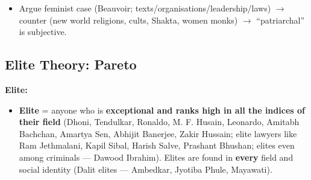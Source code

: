 \begin{QuickRevision}
\begin{itemize}
\item Argue feminist case (Beauvoir; texts/organisations/leadership/laws) $\rightarrow$ counter (new world religions, cults, Shakta, women monks) $\rightarrow$ ``patriarchal'' is subjective.
\end{itemize}
\end{QuickRevision}

\sectiondivider

\subsection{Elite Theory: Pareto}

\begin{KeyConcept}
\textbf{Elite:}
\begin{itemize}
\item \textbf{Elite} = anyone who is \textbf{exceptional and ranks high in all the indices of their field} (Dhoni, Tendulkar, Ronaldo, M. F. Husain, Leonardo, Amitabh Bachchan, Amartya Sen, Abhijit Banerjee, Zakir Hussain; elite lawyers like Ram Jethmalani, Kapil Sibal, Harish Salve, Prashant Bhushan; elites even among criminals --- Dawood Ibrahim). Elites are found in \textbf{every} field and social identity (Dalit elites --- Ambedkar, Jyotiba Phule, Mayawati).
\end{itemize}
\end{KeyConcept}

